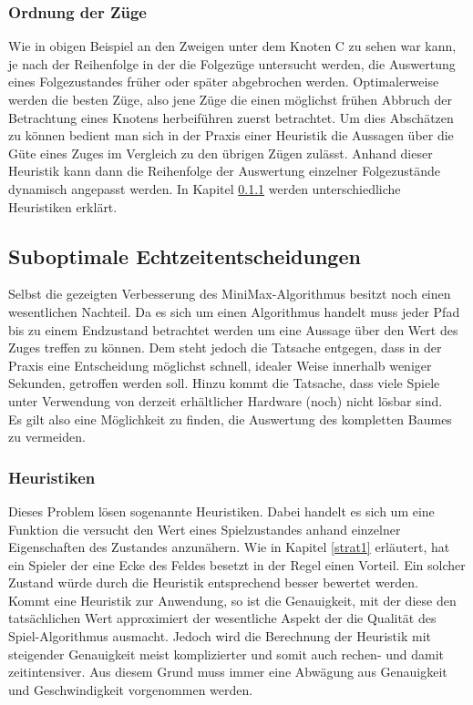 \subsubsection{Ordnung der Züge}
Wie in obigen Beispiel an den Zweigen unter dem Knoten C zu sehen war kann, je nach der Reihenfolge in der die Folgezüge untersucht werden, die Auswertung eines Folgezustandes früher oder später abgebrochen werden. Optimalerweise werden die besten Züge, also jene Züge die einen möglichst frühen Abbruch der Betrachtung eines Knotens herbeiführen zuerst betrachtet. Um dies Abschätzen zu können bedient man sich in der Praxis einer Heuristik die Aussagen über die Güte eines Zuges im Vergleich zu den übrigen Zügen zulässt. Anhand dieser Heuristik kann dann die Reihenfolge der Auswertung einzelner Folgezustände dynamisch angepasst werden. In Kapitel \ref{Heuristiken} werden unterschiedliche Heuristiken erklärt.

\subsection{Suboptimale Echtzeitentscheidungen}
Selbst die gezeigten Verbesserung des MiniMax-Algorithmus besitzt noch einen wesentlichen Nachteil. Da es sich um einen  Algorithmus handelt muss jeder Pfad bis zu einem Endzustand betrachtet werden um eine Aussage über den Wert des Zuges treffen zu können. Dem steht jedoch die Tatsache entgegen, dass in der Praxis eine Entscheidung möglichst schnell, idealer Weise innerhalb weniger Sekunden, getroffen werden soll. Hinzu kommt die Tatsache, dass viele Spiele unter Verwendung von derzeit erhältlicher Hardware (noch) nicht lösbar sind.\\
Es gilt also eine Möglichkeit zu finden, die Auswertung des kompletten Baumes zu vermeiden.

\subsubsection{Heuristiken}
\label{Heuristiken}
Dieses Problem lösen sogenannte Heuristiken. Dabei handelt es sich um eine Funktion die versucht den Wert eines Spielzustandes anhand einzelner Eigenschaften des Zustandes anzunähern. Wie in Kapitel \ref{strat1} erläutert, hat ein Spieler der eine Ecke des Feldes besetzt in der Regel einen Vorteil. Ein solcher Zustand würde durch die Heuristik entsprechend besser bewertet werden.\\
Kommt eine Heuristik zur Anwendung, so ist die Genauigkeit, mit der diese den tatsächlichen Wert approximiert der wesentliche Aspekt der die Qualität des Spiel-Algorithmus ausmacht. Jedoch wird die Berechnung der Heuristik mit steigender Genauigkeit meist komplizierter und somit auch rechen- und damit zeitintensiver. Aus diesem Grund muss immer eine Abwägung aus Genauigkeit und Geschwindigkeit vorgenommen werden. 

